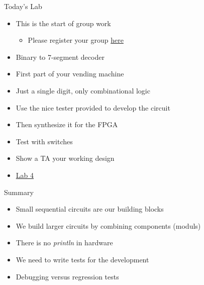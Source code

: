 \begin{frame}[fragile]{Today's Lab}
\begin{itemize}
\item This is the start of group work
\begin{itemize}
\item Please register your group \href{https://docs.google.com/spreadsheets/d/1aQs_VnPw3uiJxUz9WuzPcM1R6VkDXqPtri7a3pWoTvs/edit?usp=sharing}{here}
\end{itemize}
\item Binary to 7-segment decoder
\item First part of your vending machine
\item Just a single digit, only combinational logic
\item Use the nice tester provided to develop the circuit
\item Then synthesize it for the FPGA
\item Test with switches
\item Show a TA your working design
\item \href{https://github.com/schoeberl/chisel-lab/tree/master/lab4}{Lab 4}
\end{itemize}
\end{frame}

\begin{frame}[fragile]{Summary}
\begin{itemize}
\item Small sequential circuits are our building blocks
\item We build larger circuits by combining components (moduls)
\item There is no \emph{println} in hardware
\item We need to write tests for the development
\item Debugging versus regression tests
\end{itemize}
\end{frame}



